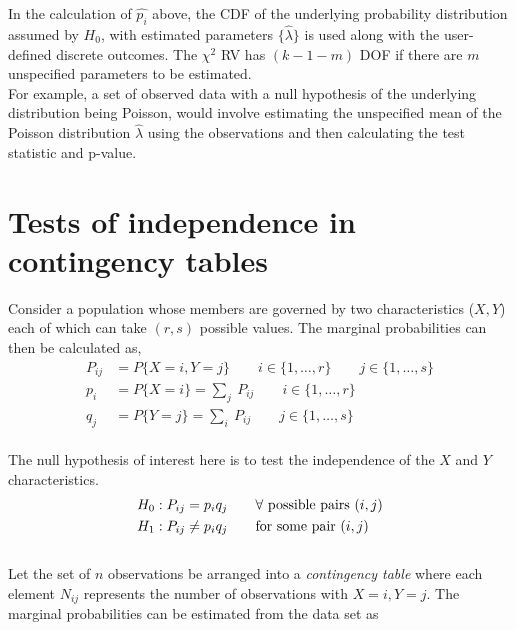 In the calculation of $ \widehat{p_i} $ above, the CDF of the underlying probability distribution assumed by $ H_0 $, with estimated parameters $ \{\widehat{\lambda}\} $ is used along with the user-defined discrete outcomes. The $ \chi^2 $ RV has $ (k-1-m) $ DOF if there are $ m $ unspecified parameters to be estimated. \\

For example, a set of observed data with a null hypothesis of the underlying distribution being Poisson, would involve estimating the unspecified mean of the Poisson distribution $ \widehat{\lambda} $ using the observations and then calculating the test statistic and p-value.\\

\section{Tests of independence in contingency tables}

Consider a population whose members are governed by two characteristics ($ X, Y $) each of which can take $ (r, s) $ possible values. The marginal probabilities can then be calculated as,\\

\begin{align}
	P_{ij} &= P\{X = i, Y = j\} \qquad i \in \{1, \dots, r\} \qquad j \in \{1, \dots, s\} \\[1ex]
	p_i &= P\{X = i\} = \sum_j\ P_{ij} \qquad i \in \{1, \dots, r\} \\
	q_j &= P\{Y = j\} = \sum_i\ P_{ij} \qquad j \in \{1, \dots, s\}
\end{align}\\

The null hypothesis of interest here is to test the independence of the $ X $ and $ Y $ characteristics.\\

\begin{align}
	H_0 &: P_{ij} = p_i q_j \qquad \forall \ \text{possible pairs $ (i, j) $}\\
	H_1 &: P_{ij} \neq p_i q_j \qquad \text{for some pair $ (i, j) $}
\end{align}\\

Let the set of $ n $ observations be arranged into a  \textit{contingency table} where each element $ N_{ij} $ represents the number of observations with $ X=i, Y=j $. The marginal probabilities can be estimated from the data set as\\


